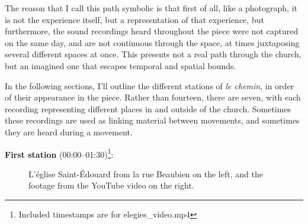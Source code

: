 \documentclass[12pt,twoside,maitrise]{dms_ks}
\theoremstyle{definition}
\begin{document}
{The reason that I call this path symbolic is that first of all, like a photograph, it is not the experience itself, but a representation of that experience, but furthermore, the sound recordings heard throughout the piece were not captured on the same day, and are not continuous through the space, at times juxtaposing several different spaces at once. 
This presents not a real path through the church, but an imagined one that escapes temporal and spatial bounds.

In the following sections, I'll outline the different stations of \textit{le chemin}, in order of their appearance in the piece. 
Rather than fourteen, there are seven, with each recording representing different places in and outside of the church. 
Sometimes these recordings are used as linking material between movements, and sometimes they are heard during a movement.

\textbf{First station} (00:00--01:30)\footnote{Included timestamps are for elegies\_video.mp4}:

\begin{figure}[h]
    \centering
    \caption{L'église Saint-Édouard from la rue Beaubien on the left, and the footage from the YouTube video on the right.}
    \label{fig:station1}
\end{figure}

}
\end{document}
